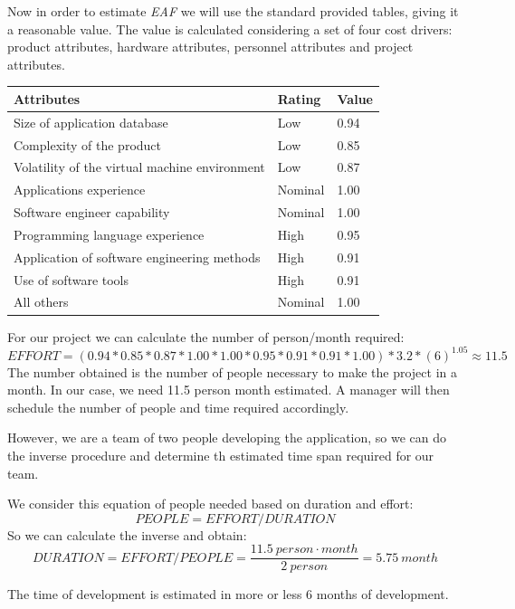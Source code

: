 \documentclass[a4paper]{scrreprt}
\begin{document}
Now in order to estimate \emph{EAF} we will use the standard provided tables, giving it a reasonable value. The value is calculated considering a set of four cost drivers: product attributes, hardware attributes, personnel attributes and project attributes.

\bigskip
\noindent
\begin{tabularx}{\linewidth}{|X|l|l|}
	\hline
	\textbf{Attributes} & \textbf{Rating} & \textbf{Value} \\ \hline
	Size of application database & Low & 0.94 \\ \hline
	Complexity of the product & Low & 0.85 \\ \hline
	Volatility of the virtual machine environment & Low & 0.87 \\ \hline
	Applications experience & Nominal & 1.00 \\ \hline
	Software engineer capability & Nominal & 1.00 \\ \hline
	Programming language experience & High & 0.95 \\ \hline
	Application of software engineering methods & High & 0.91 \\ \hline
	Use of software tools & High & 0.91 \\ \hline
	All others & Nominal & 1.00 \\ \hline
\end{tabularx}
\bigskip
For our project we can calculate the number of person/month required:
\[ EFFORT = (0.94*0.85*0.87*1.00*1.00*0.95*0.91*0.91*1.00)*3.2*(6)^{1.05} \approx 11.5 \]
The number obtained is the number of people necessary to make the project in a month. In our case, we need 11.5 person month estimated. A manager will then schedule the number of people and time required accordingly.

However, we are a team of two people developing the application, so we can do the inverse procedure and determine th estimated time span required for our team.

We consider this equation of people needed based on duration and effort:
\[PEOPLE = EFFORT / DURATION\]
So we can calculate the inverse and obtain:
\[DURATION = EFFORT / PEOPLE = \frac{11.5\ person\cdot month}{2\ person} = 5.75\ month\]

The time of development is estimated in more or less 6 months of development.

%
%
\end{document}
